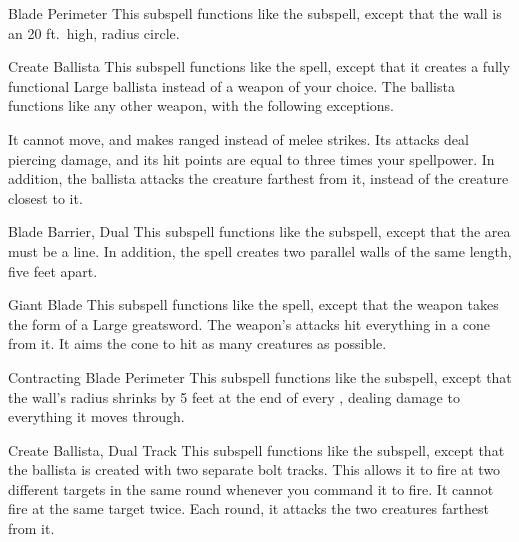 \begin{ability}[\nth{3}]{Blade Perimeter}
This subspell functions like the  subspell, except that the wall is an 20 ft.\ high, \areamed radius circle.
\end{ability}
\vspace{0.25em}


\begin{ability}[\nth{3}]{Create Ballista}
This subspell functions like the  spell, except that it creates a fully functional Large ballista instead of a weapon of your choice.
The ballista functions like any other weapon, with the following exceptions.

It cannot move, and makes ranged  instead of melee strikes.
Its attacks deal piercing damage, and its hit points are equal to three times your spellpower.
In addition, the ballista attacks the creature farthest from it, instead of the creature closest to it.
\end{ability}
\vspace{0.25em}


\begin{ability}[\nth{4}]{Blade Barrier, Dual}
This subspell functions like the  subspell, except that the area must be a line.
In addition, the spell creates two parallel walls of the same length, five feet apart.
\end{ability}
\vspace{0.25em}


\begin{ability}[\nth{4}]{Giant Blade}
This subspell functions like the  spell, except that the weapon takes the form of a Large greatsword.
The weapon's attacks hit everything in a \areasmall cone from it.
It aims the cone to hit as many creatures as possible.
\end{ability}
\vspace{0.25em}


\begin{ability}[\nth{5}]{Contracting Blade Perimeter}
This subspell functions like the  subspell, except that the wall's radius shrinks by 5 feet at the end of every , dealing damage to everything it moves through.
\end{ability}
\vspace{0.25em}


\begin{ability}[\nth{6}]{Create Ballista, Dual Track}
This subspell functions like the  subspell, except that the ballista is created with two separate bolt tracks.
This allows it to fire at two different targets in the same round whenever you command it to fire.
It cannot fire at the same target twice.
Each round, it attacks the two creatures farthest from it.
\end{ability}
\vspace{0.25em}


